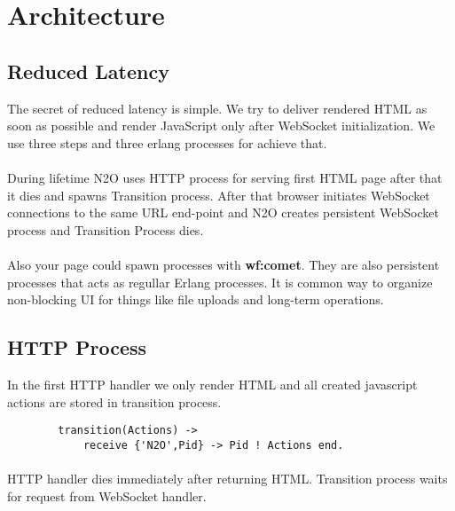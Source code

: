 \section{Architecture}

\subsection*{Reduced Latency}
The secret of reduced latency is simple. We try to deliver rendered HTML
as soon as possible and render JavaScript only after WebSocket initialization.
We use three steps and three erlang processes for achieve that.


\paragraph{}
During lifetime N2O uses HTTP process for serving first HTML page after that it dies
and spawns Transition process. After that browser initiates WebSocket connections
to the same URL end-point and N2O creates persistent WebSocket process and
Transition Process dies.

\paragraph{}
Also your page could spawn processes with {\bf wf:comet}. They are also persistent
processes that acts as regullar Erlang processes. It is common way to organize
non-blocking UI for things like file uploads and long-term operations.

\subsection{HTTP Process}
In the first HTTP handler we only render HTML and all created javascript actions are stored in transition process.

\vspace{1\baselineskip}
\begin{lstlisting}
        transition(Actions) ->
            receive {'N2O',Pid} -> Pid ! Actions end.
\end{lstlisting}

\paragraph{}
HTTP handler dies immediately after returning HTML. Transition process
waits for request from WebSocket handler.

